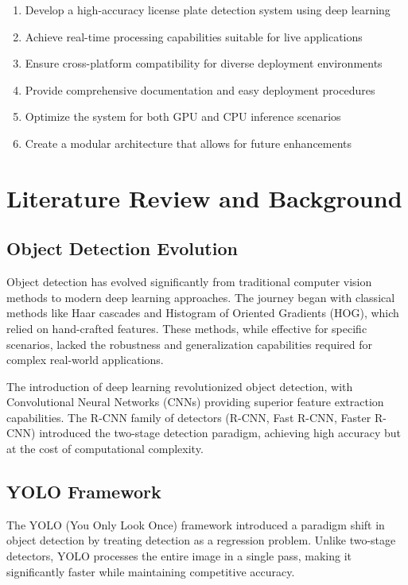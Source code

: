 \documentclass[12pt,a4paper]{article}
\begin{document}
\begin{enumerate}
    \item Develop a high-accuracy license plate detection system using deep learning
    \item Achieve real-time processing capabilities suitable for live applications
    \item Ensure cross-platform compatibility for diverse deployment environments
    \item Provide comprehensive documentation and easy deployment procedures
    \item Optimize the system for both GPU and CPU inference scenarios
    \item Create a modular architecture that allows for future enhancements
\end{enumerate}

\section{Literature Review and Background}

\subsection{Object Detection Evolution}

Object detection has evolved significantly from traditional computer vision methods to modern deep learning approaches. The journey began with classical methods like Haar cascades and Histogram of Oriented Gradients (HOG), which relied on hand-crafted features. These methods, while effective for specific scenarios, lacked the robustness and generalization capabilities required for complex real-world applications.

The introduction of deep learning revolutionized object detection, with Convolutional Neural Networks (CNNs) providing superior feature extraction capabilities. The R-CNN family of detectors (R-CNN, Fast R-CNN, Faster R-CNN) introduced the two-stage detection paradigm, achieving high accuracy but at the cost of computational complexity.

\subsection{YOLO Framework}

The YOLO (You Only Look Once) framework introduced a paradigm shift in object detection by treating detection as a regression problem. Unlike two-stage detectors, YOLO processes the entire image in a single pass, making it significantly faster while maintaining competitive accuracy.
\end{document}
